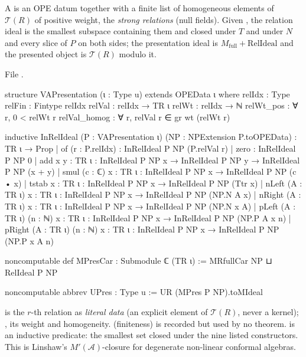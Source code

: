 \begin{definition}\label{l11:def:vapres}
A  is an OPE datum together with a finite list of homogeneous elements of $\mathcal T(R)$ of positive weight, the
\emph{strong relations} (null fields). Given , the relation ideal is the smallest subspace containing them and closed under
$T$ and under $N$ and every slice of $P$ on both sides; the presentation ideal is $M_{\mathrm{full}}+\mathrm{RelIdeal}$ and the
presented object is $\mathcal T(R)$ modulo it.
\end{definition}
\noindent File .
\begin{leancode}
structure VAPresentation (ι : Type u) extends OPEData ι where
  relIdx : Type
  relFin : Fintype relIdx
  relVal : relIdx → TR ι
  relWt : relIdx → ℕ
  relWt_pos : ∀ r, 0 < relWt r
  relVal_homog : ∀ r, relVal r ∈ gr wt (relWt r)

inductive InRelIdeal (P : VAPresentation ι) (NP : NPExtension P.toOPEData) : TR ι → Prop
  | of (r : P.relIdx) : InRelIdeal P NP (P.relVal r)
  | zero : InRelIdeal P NP 0
  | add {x y : TR ι} : InRelIdeal P NP x → InRelIdeal P NP y → InRelIdeal P NP (x + y)
  | smul (c : ℂ) {x : TR ι} : InRelIdeal P NP x → InRelIdeal P NP (c • x)
  | tstab {x : TR ι} : InRelIdeal P NP x → InRelIdeal P NP (Ttr x)
  | nLeft (A : TR ι) {x : TR ι} : InRelIdeal P NP x → InRelIdeal P NP (NP.N A x)
  | nRight (A : TR ι) {x : TR ι} : InRelIdeal P NP x → InRelIdeal P NP (NP.N x A)
  | pLeft (A : TR ι) (n : ℕ) {x : TR ι} : InRelIdeal P NP x → InRelIdeal P NP (NP.P A x n)
  | pRight (A : TR ι) (n : ℕ) {x : TR ι} : InRelIdeal P NP x → InRelIdeal P NP (NP.P x A n)

noncomputable def MPresCar : Submodule ℂ (TR ι) := MRfullCar NP ⊔ RelIdeal P NP

noncomputable abbrev UPres : Type u := UR (MPres P NP).toMIdeal
\end{leancode}

\begin{dictionary}
 is the $r$-th relation as \emph{literal data} (an explicit element of $\mathcal T(R)$, never a kernel); ,
 its weight and homogeneity.  (finiteness) is recorded but used by no theorem.  is an
inductive predicate: the smallest set closed under the nine listed constructors. This is Linshaw's $M'(\mathcal A)$-closure for
degenerate non-linear conformal algebras.
\end{dictionary}

